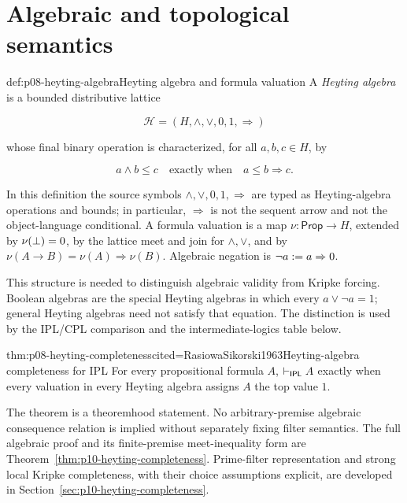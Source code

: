 \section{Algebraic and topological semantics}

\begin{hbdefinition}{def:p08-heyting-algebra}{Heyting algebra and formula valuation}
A \emph{Heyting algebra} is a bounded distributive lattice

\[
  \mathcal H=(H,\wedge,\vee,0,1,\Rightarrow)
\]

whose final binary operation is characterized, for all \(a,b,c\in H\), by

\[
  a\wedge b\leq c
  \quad\text{exactly when}\quad
  a\leq b\Rightarrow c.
\]

In this definition the source symbols \(\wedge,\vee,0,1,\Rightarrow\) are
typed as Heyting-algebra operations and bounds; in particular,
\(\Rightarrow\) is not the sequent arrow and not the object-language
conditional.  A formula valuation is a map
\(\nu:\mathsf{Prop}\to H\), extended by
\(\nu(\bot)=0\), by the lattice meet and join for
\(\land,\lor\), and by
\(\nu(A\to B)=\nu(A)\Rightarrow\nu(B)\).
Algebraic negation is
\(\neg a\mathrel{:=} a\Rightarrow0\).

This structure is needed to distinguish algebraic validity from Kripke
forcing.  Boolean algebras are the special Heyting algebras in which every
\(a\vee\neg a=1\); general Heyting
algebras need not satisfy that equation.  The distinction is used by the
IPL/CPL comparison and the intermediate-logics table below.
\end{hbdefinition}

\begin{hbtheorem}{thm:p08-heyting-completeness}{cited=RasiowaSikorski1963}{Heyting-algebra completeness for IPL}
For every propositional formula \(A\),
\(\vdash_{\mathsf{IPL}}A\) exactly when every valuation in every Heyting
algebra assigns \(A\) the top value \(1\).
\end{hbtheorem}

The theorem is a theoremhood statement.  No arbitrary-premise algebraic
consequence relation is implied without separately fixing filter semantics.
The full algebraic proof and its finite-premise meet-inequality form
are Theorem~\ref{thm:p10-heyting-completeness}.
Prime-filter representation and strong local Kripke completeness,
with their choice assumptions explicit, are developed in
Section~\ref{sec:p10-heyting-completeness}.

